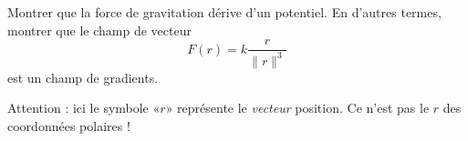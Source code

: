 
\begin{exercice}\label{exoOutilsMath-0032}

    Montrer que la force de gravitation dérive d'un potentiel. En d'autres termes, montrer que le champ de vecteur
    \begin{equation}
        F(r)=k\frac{r}{ \| r \|^3 }
    \end{equation}
    est un champ de gradients.

    Attention : ici le symbole «$r$» représente le \emph{vecteur} position. Ce n'est pas le $r$ des coordonnées polaires !

\end{exercice}

